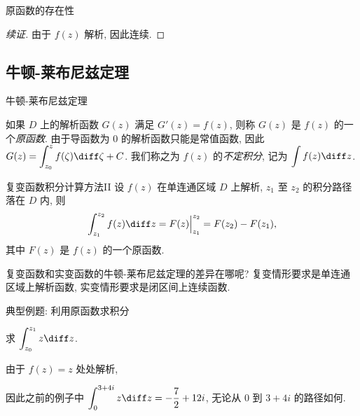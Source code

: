 \begin{frame}{原函数的存在性}
	\onslide<+->
	\begin{proof}[续证]
		由于 $f(z)$ 解析, 因此连续.
		\onslide<+->{由于 $\varepsilon$ 是任意的, 因此
		\[f(z)=\lim_{\Delta z\to 0}\frac{F(z+\Delta z)-F(z)}{\Delta z}=F'(z).\qedhere\]}
	\end{proof}
\end{frame}


\subsection{牛顿-莱布尼兹定理}

\begin{frame}{牛顿-莱布尼兹定理}

	\onslide<+->
	如果 $D$ 上的解析函数 $G(z)$ 满足 $G'(z)=f(z)$, 则称 $G(z)$ 是 $f(z)$ 的一个\emph{原函数}.
	\onslide<+->
	由于导函数为 $0$ 的解析函数只能是常值函数,
	\onslide<+->
	因此 $\displaystyle G(z)=\int_{z_0}^zf(\zeta)\diff \zeta+C$.
	\onslide<+->
	我们称之为 $f(z)$ 的\emph{不定积分}, 记为 \emph{$\displaystyle\int f(z)\diff z$}.

	\onslide<+->
	\begin{algorithm}{复变函数积分计算方法II}
		设 $f(z)$ 在单连通区域 $D$ 上解析, $z_1$ 至 $z_2$ 的积分路径落在 $D$ 内, 则
		\[
			\int_{z_1}^{z_2}f(z)\diff z=F(z)\Big|_{z_1}^{z_2}=F(z_2)-F(z_1),\]
		其中 $F(z)$ 是 $f(z)$ 的一个原函数.
	\end{algorithm}

	\onslide<+->
	复变函数和实变函数的牛顿-莱布尼兹定理的差异在哪呢?
	\onslide<+->
	复变情形要求是\alert{单连通区域上解析函数}, 实变情形要求是\alert{闭区间上连续函数}.
\end{frame}


\begin{frame}{典型例题: 利用原函数求积分}
	\onslide<+->
	\begin{example}
		求 $\displaystyle\int_{z_0}^{z_1}z\diff z$.
	\end{example}

	\onslide<+->
	\begin{solution}
		由于 $f(z)=z$ 处处解析,
		\vspace{-.5\baselineskip}
	\end{solution}
	\onslide<+->
	因此之前的例子中 $\displaystyle\int_0^{3+4i}z\diff z=-\frac72+12i$, 无论从 $0$ 到 $3+4i$ 的路径如何.
\end{frame}


